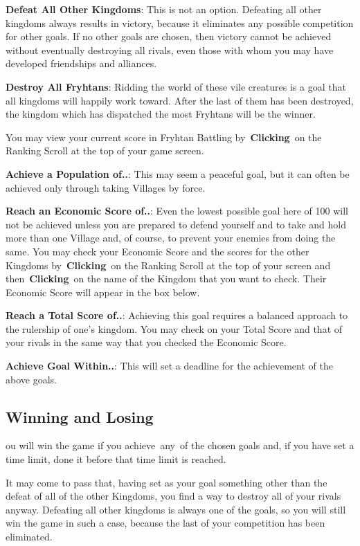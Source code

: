 \textbf{Defeat All Other Kingdoms}: This is not an option. Defeating all other kingdoms always results in victory, because it eliminates any possible competition for other goals. If no other goals are chosen, then victory cannot be achieved without eventually destroying all rivals, even those with whom you may have developed friendships and alliances.

\textbf{Destroy All Fryhtans}: Ridding the world of these vile creatures is a goal that all kingdoms will happily work toward. After the last of them has been destroyed, the kingdom which has dispatched the most Fryhtans will be the winner.

You may view your current score in Fryhtan Battling by \textbf{Clicking} on the Ranking Scroll at the top of your game screen.


\textbf{Achieve a Population of..}: This may seem a peaceful goal, but it can often be achieved only through taking Villages by force.

\textbf{Reach an Economic Score of..}: Even the lowest possible goal here of 100 will not be achieved unless you are prepared to defend yourself and to take and hold more than one Village and, of course, to prevent your enemies from doing the same. You may check your Economic Score and the scores for the other Kingdoms by \textbf{Clicking} on the Ranking Scroll at the top of your screen and then \textbf{Clicking} on the name of the Kingdom that you want to check. Their Economic Score will appear in the box below.

\textbf{Reach a Total Score of..}: Achieving this goal requires a balanced approach to the rulership of one’s kingdom. You may check on your Total Score and that of your rivals in the same way that you checked the Economic Score.

\textbf{Achieve Goal Within..}: This will set a deadline for the achievement of the above goals.

\subsection{Winning and Losing}


ou will win the game if you achieve any of the chosen goals and, if you have set a time limit, done it before that time limit is reached.

It may come to pass that, having set as your goal something other than the defeat of all of the other Kingdoms, you find a way to destroy all of your rivals anyway. Defeating all other kingdoms is always one of the goals, so you will still win the game in such a case, because the last of your competition has been eliminated.

